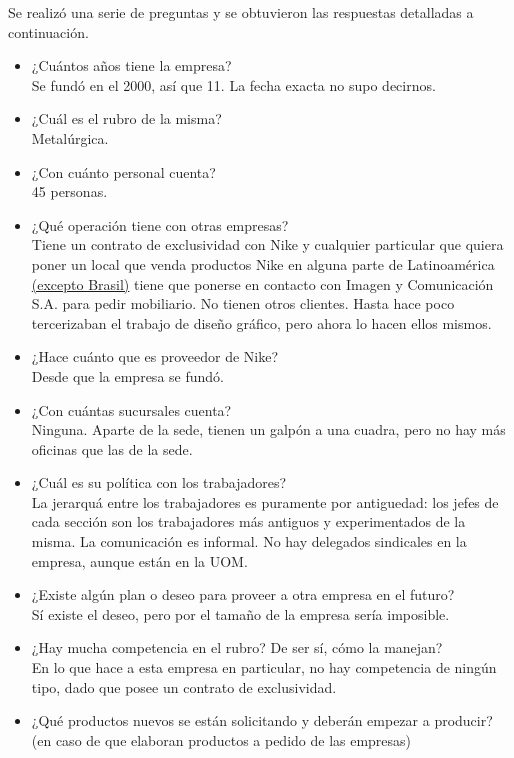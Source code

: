 \documentclass[a4paper,10pt,titlepage]{article}
\begin{document}
Se realiz\'o una serie de preguntas y se obtuvieron las respuestas detalladas a continuaci\'on.

\begin{itemize}

\item ¿Cu\'antos a\~nos tiene la empresa? \\
Se fund\'o en el 2000, as\'i que 11. La fecha exacta no supo decirnos.
\item ¿Cu\'al es el rubro de la misma? \\
Metal\'urgica.
\item ¿Con cu\'anto personal cuenta? \\
45 personas.
\item ¿Qu\'e operaci\'on tiene con otras empresas? \\
Tiene un contrato de exclusividad con Nike y cualquier particular que quiera poner un local que venda productos Nike 
en alguna parte de Latinoam\'erica \underline{(excepto Brasil)} tiene que ponerse en contacto con Imagen y Comunicación S.A. 
para pedir mobiliario. No tienen otros clientes. Hasta hace poco tercerizaban el trabajo de diseño gr\'afico, pero ahora lo hacen ellos mismos.
\item ¿Hace cu\'anto que es proveedor de Nike? \\
Desde que la empresa se fund\'o.
\item ¿Con cu\'antas sucursales cuenta? \\
Ninguna. Aparte de la sede, tienen un galp\'on a una cuadra, pero no hay m\'as oficinas que las de la sede.
\item ¿Cu\'al es su pol\'itica con los trabajadores? \\
La jerarqu\'a entre los trabajadores es puramente por antiguedad: los jefes de cada secci\'on son los trabajadores m\'as antiguos
 y experimentados de la misma. La comunicaci\'on es informal. No hay delegados sindicales en la empresa, aunque est\'an en la UOM.
\item ¿Existe alg\'un plan o deseo para proveer a otra empresa en el futuro? \\
S\'i existe el deseo, pero por el tamaño de la empresa ser\'ia imposible.
\item ¿Hay mucha competencia en el rubro? De ser s\'i, c\'omo la manejan? \\
En lo que hace a esta empresa en particular, no hay competencia de ning\'un tipo, dado que posee un contrato de exclusividad.
\item ¿Qu\'e productos nuevos se est\'an solicitando y deber\'an empezar a producir? (en caso de que elaboran productos a pedido de las empresas) \\

\end{itemize}
\end{document}
